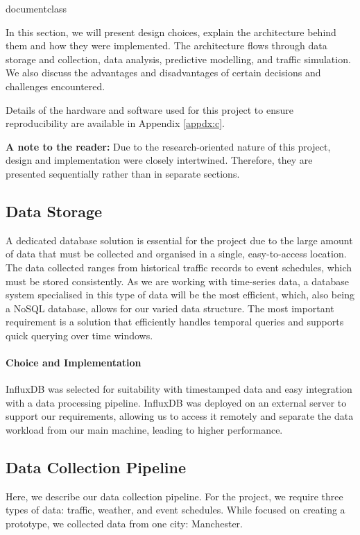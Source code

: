 \csname documentclass
\graphicspath{{\subfix{../images/}}}


In this section, we will present design choices, explain the architecture behind them and how they were implemented. The architecture flows through data storage and collection, data analysis, predictive modelling, and traffic simulation. We also discuss the advantages and disadvantages of certain decisions and challenges encountered.

Details of the hardware and software used for this project to ensure reproducibility are available in Appendix \ref{appdx:c}.

\textbf{A note to the reader:} Due to the research-oriented nature of this project, design and implementation were closely intertwined. Therefore, they are presented sequentially rather than in separate sections.

\subsection{Data Storage}
A dedicated database solution is essential for the project due to the large amount of data that must be collected and organised in a single, easy-to-access location. The data collected ranges from historical traffic records to event schedules, which must be stored consistently. As we are working with time-series data, a database system specialised in this type of data will be the most efficient, which, also being a NoSQL database, allows for our varied data structure. The most important requirement is a solution that efficiently handles temporal queries and supports quick querying over time windows.

\paragraph{Choice and Implementation} InfluxDB \cite{noauthor_influxdb_2022} was selected for suitability with timestamped data and easy integration with a data processing pipeline. InfluxDB was deployed on an external server to support our requirements, allowing us to access it remotely and separate the data workload from our main machine, leading to higher performance.

\subsection{Data Collection Pipeline}
Here, we describe our data collection pipeline. For the project, we require three types of data: traffic, weather, and event schedules. While focused on creating a prototype, we collected data from one city: Manchester.

